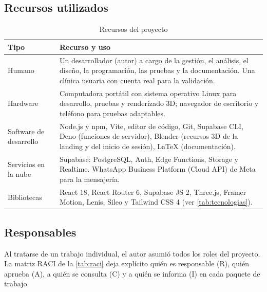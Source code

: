 \documentclass[11pt]{article}
\begin{document}
\subsection{Recursos utilizados}

\begin{table}[H]
\centering\small
\caption{Recursos del proyecto}\label{tab:recursos}
\begin{tabularx}{\linewidth}{@{}P{2.9cm}L@{}}
\toprule
\textbf{Tipo} & \textbf{Recurso y uso} \\
\midrule
Humano & Un desarrollador (autor) a cargo de la gestión, el análisis, el diseño, la programación, las pruebas y la documentación. Una clínica usuaria con cuenta real para la validación. \\
Hardware & Computadora portátil con sistema operativo Linux para desarrollo, pruebas y renderizado 3D; navegador de escritorio y teléfono para pruebas adaptables. \\
Software de desarrollo & Node.js y npm, Vite, editor de código, Git, Supabase CLI, Deno (funciones de servidor), Blender (recursos 3D de la landing y del inicio de sesión), \LaTeX{} (documentación). \\
Servicios en la nube & Supabase: PostgreSQL, Auth, Edge Functions, Storage y Realtime. WhatsApp Business Platform (Cloud API) de Meta para la mensajería. \\
Bibliotecas & React 18, React Router 6, Supabase JS 2, Three.js, Framer Motion, Lenis, Sileo y Tailwind CSS 4 (ver \cref{tab:tecnologias}). \\
\bottomrule
\end{tabularx}
\end{table}

\subsection{Responsables}

Al tratarse de un trabajo individual, el autor asumió todos los roles del proyecto. La matriz RACI de la \cref{tab:raci} deja explícito quién es responsable (R), quién aprueba (A), a quién se consulta (C) y a quién se informa (I) en cada paquete de trabajo.
\end{document}
